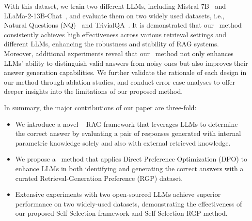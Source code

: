 
With this dataset, we train two different LLMs, including Mistral-7B~\cite{jiang2023mistral7b} and LLaMa-2-13B-Chat~\cite{touvron2023llama2openfoundation}, and evaluate them on two widely used datasets, i.e., Natural Questions (NQ)~\cite{kwiatkowski2019natural} and TrivialQA~\cite{joshi2017triviaqa}.
It is demonstrated that our \approach~method consistently achieves high effectiveness across various retrieval settings and different LLMs, enhancing the robustness and stability of RAG systems.
Moreover, additional experiments reveal that our \approach~method not only enhances LLMs' ability to distinguish valid answers from noisy ones but also improves their answer generation capabilities.
We further validate the rationale of each design in our method through ablation studies, and conduct error case analyses to offer deeper insights into the limitations of our proposed method.


In summary, the major contributions of our paper are three-fold: 
\begin{itemize} []
\item  We introduce a novel \framework~ RAG framework that leverages LLMs to determine the correct answer by evaluating a pair of responses generated with internal parametric knowledge solely and also with external retrieved knowledge.
\item  We propose a \approach~method that applies Direct Preference Optimization (DPO) to enhance LLMs in both identifying and generating the correct answers with a curated Retrieval-Generation Preference (RGP) dataset.
\item Extensive experiments with two open-sourced LLMs achieve superior performance on two widely-used datasets, demonstrating the effectiveness of our proposed Self-Selection framework and Self-Selection-RGP method.
\end{itemize}
